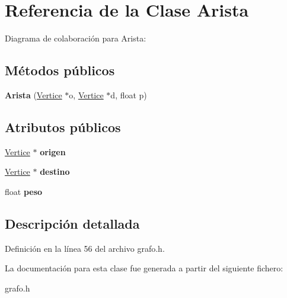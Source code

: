 \hypertarget{classArista}{}\section{Referencia de la Clase Arista}
\label{classArista}


Diagrama de colaboración para Arista\+:
\subsection*{Métodos públicos}
\begin{DoxyCompactItemize}
\item 
\mbox{\label{classArista_abfc5e334e70240f90b0f8d0cc094ad40}} 
{\bfseries Arista} (\hyperlink{classVertice}{Vertice} $\ast$o, \hyperlink{classVertice}{Vertice} $\ast$d, float p)
\end{DoxyCompactItemize}
\subsection*{Atributos públicos}
\begin{DoxyCompactItemize}
\item 
\mbox{\label{classArista_a9eb724ff0d46897de85b760d36a2e6b4}} 
\hyperlink{classVertice}{Vertice} $\ast$ {\bfseries origen}
\item 
\mbox{\label{classArista_a41f8fed9f49c9216330c65caafc145d1}} 
\hyperlink{classVertice}{Vertice} $\ast$ {\bfseries destino}
\item 
\mbox{\label{classArista_a371fdf684b589d3b3d842ad5ae338342}} 
float {\bfseries peso}
\end{DoxyCompactItemize}


\subsection{Descripción detallada}


Definición en la línea 56 del archivo grafo.\+h.



La documentación para esta clase fue generada a partir del siguiente fichero\+:\begin{DoxyCompactItemize}
\item 
grafo.\+h\end{DoxyCompactItemize}
